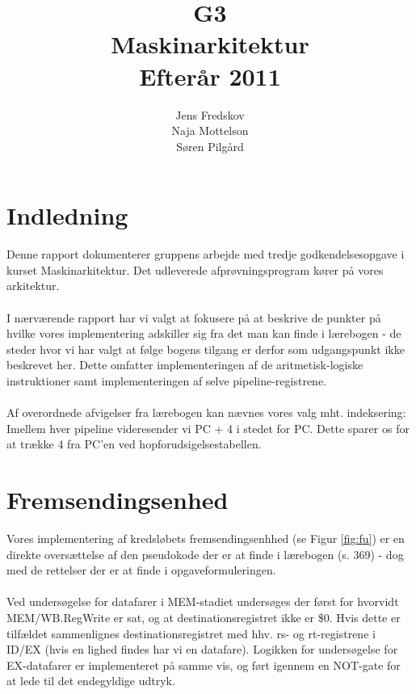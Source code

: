 \documentclass[10pt,a4paper,danish]{article}
\title{G3\\Maskinarkitektur\\Efterår 2011}
\author{Jens Fredskov\\ Naja Mottelson\\Søren Pilgård}
\begin{document}
\maketitle
\newpage

\tableofcontents
\newpage

\section{Indledning}
Denne rapport dokumenterer gruppens arbejde med tredje godkendelsesopgave i kurset 
Maskinarkitektur. Det udleverede afprøvningsprogram kører på vores arkitektur. 

\paragraph{}
I nærværende rapport har vi valgt at fokusere på at beskrive de punkter på 
hvilke vores implementering adskiller sig fra det man kan finde i lærebogen - 
de steder hvor vi har valgt at følge bogens tilgang er derfor som udgangspunkt
ikke beskrevet her. Dette omfatter implementeringen af de aritmetisk-logiske
instruktioner samt implementeringen af selve pipeline-registrene.  

\paragraph{}
Af overordnede afvigelser fra lærebogen kan nævnes vores valg mht. indeksering:
Imellem hver pipeline videresender vi PC + 4 i stedet for PC. Dette sparer os 
for at trække 4 fra PC'en ved hopforudsigelsestabellen. 

\paragraph{}

\section{Fremsendingsenhed}
Vores implementering af kredsløbets fremsendingsenhhed (se Figur \ref{fig:fu}) er 
en direkte oversættelse af den pseudokode der er at finde i lærebogen (s. 369)
- dog med de rettelser der er at finde i opgaveformuleringen. 

\paragraph{}
Ved undersøgelse for datafarer i MEM-stadiet undersøges der først 
for hvorvidt MEM/WB.RegWrite er sat, og at destinationsregistret
ikke er \$0. Hvis dette er tilfældet sammenlignes destinationsregistret
med hhv. rs- og rt-registrene i ID/EX (hvis en lighed findes har vi en 
datafare). Logikken for undersøgelse for EX-datafarer er implementeret
på samme vis, og ført igennem en NOT-gate for at lede til det endegyldige
udtryk. 
\end{document}
